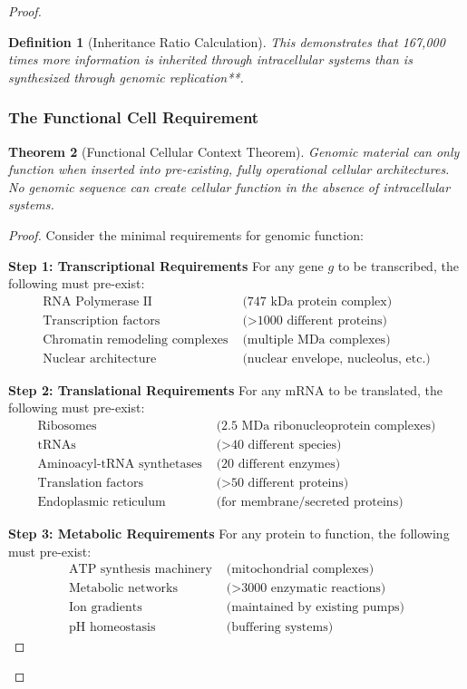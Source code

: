 \documentclass[12pt,a4paper]{article}
\newtheorem{theorem}{Theorem}[section]
\newtheorem{definition}[theorem]{Definition}
\begin{document}
\begin{proof}
\begin{definition}[Inheritance Ratio Calculation]
This demonstrates that 167,000 times more information is inherited through intracellular systems than is synthesized through genomic replication**.
\end{definition}

\subsubsection{The Functional Cell Requirement}

\begin{theorem}[Functional Cellular Context Theorem]
Genomic material can only function when inserted into pre-existing, fully operational cellular architectures. No genomic sequence can create cellular function in the absence of intracellular systems.
\end{theorem}

\begin{proof}
Consider the minimal requirements for genomic function:

\textbf{Step 1: Transcriptional Requirements}
For any gene $g$ to be transcribed, the following must pre-exist:
\begin{align}
\text{RNA Polymerase II} &\text{ (747 kDa protein complex)} \\
\text{Transcription factors} &\text{ (>1000 different proteins)} \\
\text{Chromatin remodeling complexes} &\text{ (multiple MDa complexes)} \\
\text{Nuclear architecture} &\text{ (nuclear envelope, nucleolus, etc.)}
\end{align}

\textbf{Step 2: Translational Requirements}
For any mRNA to be translated, the following must pre-exist:
\begin{align}
\text{Ribosomes} &\text{ (2.5 MDa ribonucleoprotein complexes)} \\
\text{tRNAs} &\text{ (>40 different species)} \\
\text{Aminoacyl-tRNA synthetases} &\text{ (20 different enzymes)} \\
\text{Translation factors} &\text{ (>50 different proteins)} \\
\text{Endoplasmic reticulum} &\text{ (for membrane/secreted proteins)}
\end{align}

\textbf{Step 3: Metabolic Requirements}
For any protein to function, the following must pre-exist:
\begin{align}
\text{ATP synthesis machinery} &\text{ (mitochondrial complexes)} \\
\text{Metabolic networks} &\text{ (>3000 enzymatic reactions)} \\
\text{Ion gradients} &\text{ (maintained by existing pumps)} \\
\text{pH homeostasis} &\text{ (buffering systems)}
\end{align}


\end{proof}
\end{proof}
\end{document}
